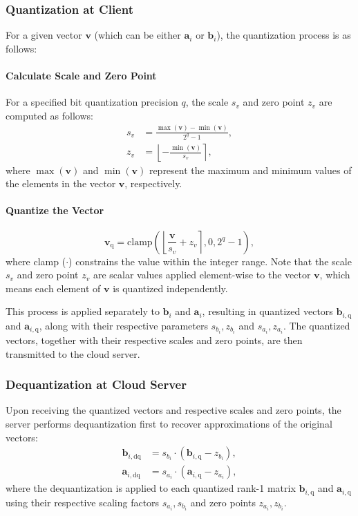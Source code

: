 \documentclass[journal]{IEEEtran}
\begin{document}
\subsubsection{Quantization at Client}
For a given vector \(\mathbf{v}\) (which can be either \(\mathbf{a}_i\) or \(\mathbf{b}_i\)), the quantization process is as follows:

\paragraph{Calculate Scale and Zero Point}
For a specified bit quantization precision \(q\), the scale $s_v$ and zero point $z_v$ are computed as follows:
\begin{align}
    s_v &= \frac{\max(\mathbf{v}) - \min(\mathbf{v})}{2^q - 1}, \\
    z_v &= \left\lfloor-\frac{\min(\mathbf{v})}{s_v}\right\rceil,
\end{align}
where \(\max(\mathbf{v})\) and \(\min(\mathbf{v})\) represent the maximum and minimum values of the elements in the vector \(\mathbf{v}\), respectively.

\paragraph{Quantize the Vector}
    \begin{equation}
    \mathbf{v}_\text{q} = \text{clamp}\left(\left\lfloor\frac{\mathbf{v}}{s_v} + z_v\right\rceil,0, 2^q - 1\right),
    \end{equation}
where clamp ($\cdot$) constrains the value within the integer range. Note that the scale \(s_v\) and zero point \(z_v\) are scalar values applied element-wise to the vector \(\mathbf{v}\), which means each element of \(\mathbf{v}\) is quantized independently.

This process is applied separately to \(\mathbf{b}_i\) and \(\mathbf{a}_i\), resulting in quantized vectors \(\mathbf{b}_{i,\text{q}}\) and \(\mathbf{a}_{i,\text{q}}\), along with their respective parameters \(s_{b_i}, z_{b_i}\) and \(s_{a_i}, z_{a_i}\). The quantized vectors, together with their respective scales and zero points, are then transmitted to the cloud server.

\subsubsection{Dequantization at Cloud Server}
Upon receiving the quantized vectors and respective scales and zero points, the server performs dequantization first to recover approximations of the original vectors:
\begin{align}
\mathbf{b}_{i, \text{dq}} &= s_{b_i} \cdot (\mathbf{b}_{i, \text{q}} - z_{b_i}), \\
\mathbf{a}_{i, \text{dq}} &= s_{a_i} \cdot (\mathbf{a}_{i, \text{q}} - z_{a_i}),
\end{align}
where the dequantization is applied to each quantized rank-1 matrix \(\mathbf{b}_{i, \text{q}}\) and \(\mathbf{a}_{i, \text{q}}\) using their respective scaling factors \(s_{a_i}, s_{b_i}\) and zero points \(z_{a_i}, z_{b_i}\).  
\end{document}
